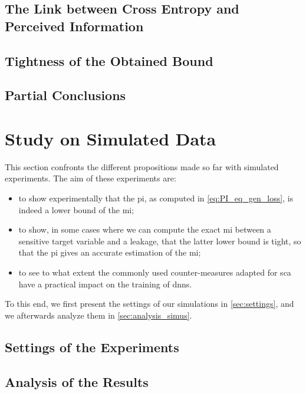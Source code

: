 \subsection{The Link between Cross Entropy and Perceived Information}
    \label{sec:PI}
    

\subsection{Tightness of the Obtained Bound}
    \label{sec:div_term}
    

\subsection{Partial Conclusions}
    \label{sec:part_ccl}
    

\section{Study on Simulated Data}
    \label{sec:simus}
    This section confronts the different propositions made so far with simulated experiments.
    The aim of these experiments are:
    \begin{itemize}
        \item to show experimentally that the \gls{pi}, as computed in \autoref{eq:PI_eq_gen_loss}, is indeed a lower bound of the \gls{mi};
        \item to show, in some cases where we can compute the exact \gls{mi} between a sensitive target variable and a leakage, that the latter lower bound is tight, so that the \gls{pi} gives an accurate estimation of the \gls{mi};
        \item to see to what extent the commonly used counter-measures adapted for \gls{sca} have a practical impact on the training of \glspl{dnn}.
    \end{itemize}
    To this end, we first present the settings of our simulations in \autoref{sec:settings}, and we afterwards analyze them in \autoref{sec:analysis_simus}.

\subsection{Settings of the Experiments}
    \label{sec:settings}
    

\subsection{Analysis of the Results}
    \label{sec:analysis_simus}
    

